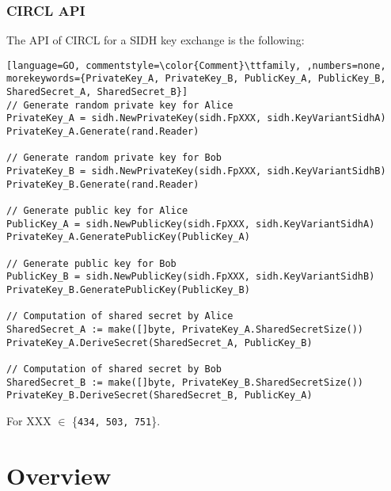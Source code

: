 \subsubsection{\gls{CIRCL} API}
The API of \gls{CIRCL} for a \gls{SIDH} key exchange is the following:

\begin{lstlisting}[language=GO, commentstyle=\color{Comment}\ttfamily, ,numbers=none, morekeywords={PrivateKey_A, PrivateKey_B, PublicKey_A, PublicKey_B, SharedSecret_A, SharedSecret_B}]
// Generate random private key for Alice
PrivateKey_A = sidh.NewPrivateKey(sidh.FpXXX, sidh.KeyVariantSidhA)
PrivateKey_A.Generate(rand.Reader)

// Generate random private key for Bob
PrivateKey_B = sidh.NewPrivateKey(sidh.FpXXX, sidh.KeyVariantSidhB)
PrivateKey_B.Generate(rand.Reader)

// Generate public key for Alice
PublicKey_A = sidh.NewPublicKey(sidh.FpXXX, sidh.KeyVariantSidhA)
PrivateKey_A.GeneratePublicKey(PublicKey_A)

// Generate public key for Bob
PublicKey_B = sidh.NewPublicKey(sidh.FpXXX, sidh.KeyVariantSidhB)
PrivateKey_B.GeneratePublicKey(PublicKey_B)

// Computation of shared secret by Alice
SharedSecret_A := make([]byte, PrivateKey_A.SharedSecretSize())
PrivateKey_A.DeriveSecret(SharedSecret_A, PublicKey_B)

// Computation of shared secret by Bob
SharedSecret_B := make([]byte, PrivateKey_B.SharedSecretSize())
PrivateKey_B.DeriveSecret(SharedSecret_B, PublicKey_A)

\end{lstlisting}
For XXX $\in$ \{\texttt{434, 503, 751}\}.

\section{Overview}

